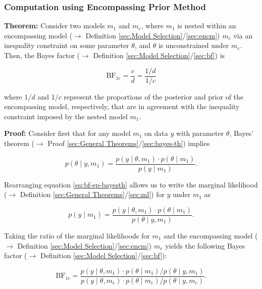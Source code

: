 \documentclass[a4paper,12pt,twoside]{book}
\begin{document}
\subsubsection[\textbf{Computation using Encompassing Prior Method}]{Computation using Encompassing Prior Method} \label{sec:bf-ep}
\setcounter{equation}{0}

\textbf{Theorem:} Consider two models $m_1$ and $m_e$, where $m_1$ is nested within an encompassing model ($\rightarrow$ Definition \ref{sec:Model Selection}/\ref{sec:encm}) $m_e$ via an inequality constraint on some parameter $\theta$, and $\theta$ is unconstrained under $m_e$. Then, the Bayes factor ($\rightarrow$ Definition \ref{sec:Model Selection}/\ref{sec:bf}) is

\begin{equation} \label{eq:bf-ep-bf-ep}
  \text{BF}_{1e} = \frac{c}{d} = \frac{1/d}{1/c}
\end{equation}

where $1/d$ and $1/c$ represent the proportions of the posterior and prior of the encompassing model, respectively, that are in agreement with the inequality constraint imposed by the nested model $m_1$.

\vspace{1em}
\textbf{Proof:} Consider first that for any model $m_1$ on data $y$ with parameter $\theta$, Bayes' theorem ($\rightarrow$ Proof \ref{sec:General Theorems}/\ref{sec:bayes-th}) implies

\begin{equation} \label{eq:bf-ep-bayesth}
  p(\theta \mid y,m_1) = \frac{p(y \mid \theta,m_1) \cdot p(\theta \mid m_1)}{p(y \mid m_1)}.
\end{equation}

Rearranging equation \eqref{eq:bf-ep-bayesth} allows us to write the marginal likelihood ($\rightarrow$ Definition \ref{sec:General Theorems}/\ref{sec:ml}) for $y$ under $m_1$ as

\begin{equation} \label{eq:bf-ep-marginal}
  p(y \mid m_1) = \frac{p(y \mid \theta,m_1) \cdot p(\theta \mid m_1)}{p(\theta \mid y,m_1)}.
\end{equation}

Taking the ratio of the marginal likelihoods for $m_1$ and the encompassing model ($\rightarrow$ Definition \ref{sec:Model Selection}/\ref{sec:encm}) $m_e$ yields the following Bayes factor ($\rightarrow$ Definition \ref{sec:Model Selection}/\ref{sec:bf}):

\begin{equation} \label{eq:bf-ep-bayesfactor}
  \text{BF}_{1e} = \frac{p(y \mid \theta,m_1) \cdot p(\theta \mid m_1) / p(\theta \mid y,m_1)}{p(y \mid \theta,m_e) \cdot p(\theta \mid m_e) / p(\theta \mid y,m_e)}.
\end{equation}
\end{document}
